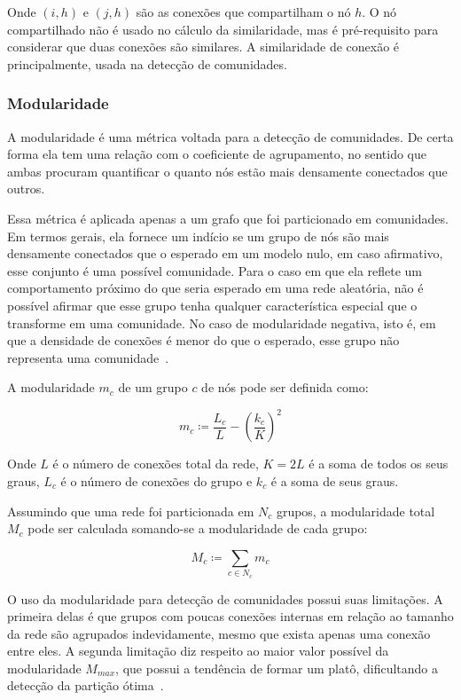 \documentclass[12pt,a4paper]{article}
\theoremstyle{hypo}
\newcommand{\defn}{\coloneqq} %
\begin{document}
Onde $(i,h)$ e $(j,h)$ são as conexões que compartilham o nó $h$. O nó compartilhado não é usado no cálculo da similaridade, mas é pré-requisito para considerar que duas conexões são similares. A similaridade de conexão é principalmente, usada na detecção de comunidades.

\subsubsection{Modularidade} \label{sec:modularidade}

A modularidade é uma métrica voltada para a detecção de comunidades. De certa forma ela tem uma relação com o coeficiente de agrupamento, no sentido que ambas procuram quantificar o quanto nós estão mais densamente conectados que outros.

Essa métrica é aplicada apenas a um grafo que foi particionado em comunidades. Em termos gerais, ela fornece um indício se um grupo de nós são mais densamente conectados que o esperado em um modelo nulo, em caso afirmativo, esse conjunto é uma possível comunidade. Para o caso em que ela reflete um comportamento próximo do que seria esperado em uma rede aleatória, não é possível afirmar que esse grupo tenha qualquer característica especial que o transforme em uma comunidade. No caso de modularidade negativa, isto é, em que a densidade de conexões é menor do que o esperado, esse grupo não representa uma comunidade~\cite{Barabasi2016-rn}.

A modularidade $m_c$ de um grupo $c$ de nós pode ser definida como:

\begin{equation} \label{eq:modularidade-local}
m_c \defn \frac{L_c}{L} - \left( \frac{k_c}{K} \right)^2
\end{equation}

Onde $L$ é o número de conexões total da rede, $K = 2L$ é a soma de todos os seus graus, $L_c$ é o número de conexões do grupo e $k_c$ é a soma de seus graus.

Assumindo que uma rede foi particionada em $N_c$ grupos, a modularidade total $M_c$ pode ser calculada somando-se a modularidade de cada grupo:

\begin{equation} \label{eq:modularidade-global}
M_c \defn \sum_{c \in N_c} m_c
\end{equation}

O uso da modularidade para detecção de comunidades possui suas limitações. A primeira delas é que grupos com poucas conexões internas em relação ao tamanho da rede são agrupados indevidamente, mesmo que exista apenas uma conexão entre eles. A segunda limitação diz respeito ao maior valor possível da modularidade $M_\textit{max}$, que possui a tendência de formar um platô, dificultando a detecção da partição ótima~\cite{Barabasi2016-rn}.
\end{document}
